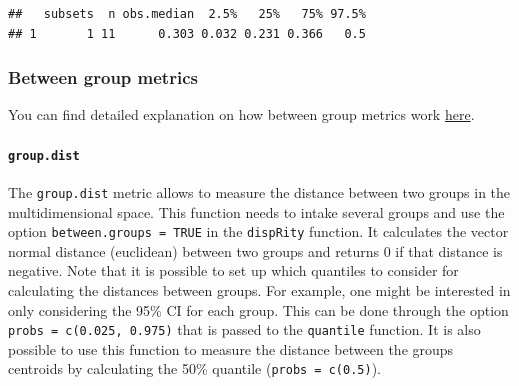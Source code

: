 \documentclass[
]{book}
\newenvironment{Shaded}{\begin{snugshade}}{\end{snugshade}}
\newcommand{\CommentTok}[1]{\textcolor[rgb]{0.56,0.35,0.01}{\textit{#1}}}
\newcommand{\ControlFlowTok}[1]{\textcolor[rgb]{0.13,0.29,0.53}{\textbf{#1}}}
\newcommand{\DataTypeTok}[1]{\textcolor[rgb]{0.13,0.29,0.53}{#1}}
\newcommand{\DecValTok}[1]{\textcolor[rgb]{0.00,0.00,0.81}{#1}}
\newcommand{\KeywordTok}[1]{\textcolor[rgb]{0.13,0.29,0.53}{\textbf{#1}}}
\newcommand{\NormalTok}[1]{#1}
\newcommand{\OperatorTok}[1]{\textcolor[rgb]{0.81,0.36,0.00}{\textbf{#1}}}
\newcommand{\OtherTok}[1]{\textcolor[rgb]{0.56,0.35,0.01}{#1}}
\newcommand{\StringTok}[1]{\textcolor[rgb]{0.31,0.60,0.02}{#1}}
\begin{document}
\begin{Shaded}
\end{Shaded}

\begin{verbatim}
##   subsets  n obs.median  2.5%   25%   75% 97.5%
## 1       1 11      0.303 0.032 0.231 0.366   0.5
\end{verbatim}

\hypertarget{betweengroupmetricslist}{%
\subsubsection{Between group metrics}\label{betweengroupmetricslist}}

You can find detailed explanation on how between group metrics work \protect\hyperlink{betweengroupmetricsexplain}{here}.

\hypertarget{group.dist}{%
\paragraph{\texorpdfstring{\texttt{group.dist}}{group.dist}}\label{group.dist}}

The \texttt{group.dist} metric allows to measure the distance between two groups in the multidimensional space.
This function needs to intake several groups and use the option \texttt{between.groups\ =\ TRUE} in the \texttt{dispRity} function.
It calculates the vector normal distance (euclidean) between two groups and returns 0 if that distance is negative.
Note that it is possible to set up which quantiles to consider for calculating the distances between groups.
For example, one might be interested in only considering the 95\% CI for each group.
This can be done through the option \texttt{probs\ =\ c(0.025,\ 0.975)} that is passed to the \texttt{quantile} function.
It is also possible to use this function to measure the distance between the groups centroids by calculating the 50\% quantile (\texttt{probs\ =\ c(0.5)}).
\end{document}
